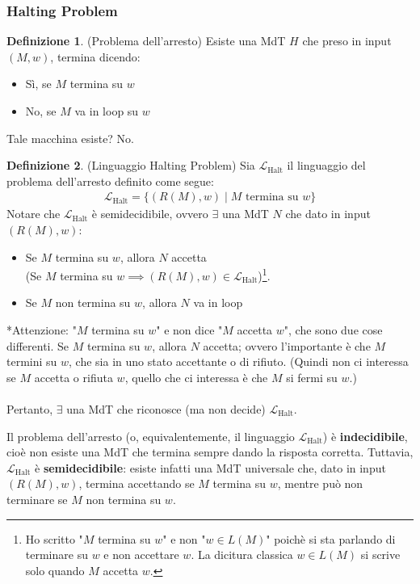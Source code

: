 \documentclass{article}  %
\theoremstyle{definition}
\newtheorem{definition}{Definizione}[section]
\begin{document}
\subsubsection{Halting Problem}
\begin{definition}(Problema dell'arresto)
	Esiste una MdT $H$ che preso in input $(M,w)$, termina dicendo:
	\begin{itemize}
		\item Sì, se $M$ termina su $w$
		\item No, se $M$ va in loop su $w$
	\end{itemize}
	Tale macchina esiste? No.
\end{definition}
\begin{definition}(Linguaggio Halting Problem) Sia $\mathcal{L}_{\text{Halt}}$ il linguaggio del problema dell'arresto definito come segue:
	\begin{align*}
		\mathcal{L}_{\text{Halt}} = \{(R(M),w) \mid M \text{ termina su } w\}
	\end{align*}
	Notare che $\mathcal{L}_{\text{Halt}}$ è semidecidibile, ovvero $\exists$ una MdT $N$ che dato in input $(R(M),w)$:
	\begin{itemize}
		\item Se $M$ termina su $w$, allora $N$ accetta \\ (Se $M$ termina su $w \implies (R(M),w) \in \mathcal{L}_{\text{Halt}}$)\footnote{Ho scritto
			      "$M$ termina su $w$" e non "$w \in L(M)$" poichè si sta parlando di terminare su $w$ e non accettare $w$. La dicitura
			      classica $w \in L(M)$ si scrive solo quando $M$ accetta $w$.}.
		\item Se $M$ non termina su $w$, allora $N$ va in loop
	\end{itemize}
	*Attenzione: "$M$ termina su $w$" e non dice "$M$ accetta $w$", che sono due cose differenti.
	Se $M$ termina su $w$, allora $N$ accetta; ovvero l'importante è che $M$ termini su $w$, che sia in uno stato accettante o di rifiuto. (Quindi non ci interessa
	se $M$ accetta o rifiuta $w$, quello che ci interessa è che $M$ si fermi su $w$.) \\ \\
	Pertanto, $\exists$ una MdT che riconosce (ma non decide) $\mathcal{L}_{\text{Halt}}$.
\end{definition}

\begin{osservazioni}[Osservazione]
	\footnotesize %
	Il problema dell'arresto (o, equivalentemente, il linguaggio
	$\mathcal{L}_{\text{Halt}}$) è \textbf{indecidibile}, cioè non esiste una MdT che
	termina sempre dando la risposta corretta.
	Tuttavia, $\mathcal{L}_{\text{Halt}}$ è \textbf{semidecidibile}: esiste infatti una MdT universale che, dato in input
	$(R(M),w)$, termina accettando se $M$ termina su $w$, mentre può non
	terminare se $M$ non termina su $w$.
\end{osservazioni}
\end{document}
